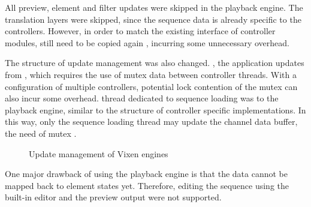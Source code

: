 All preview, element and filter updates were skipped in the playback engine. The translation layers were skipped, since the sequence data is already specific to the controllers. However, in order to match the existing interface of controller modules,  still need to be copied again , incurring some unnecessary overhead.

The structure of update management was also changed. , the application updates  from , which requires the use of mutex  data  between controller threads. With a configuration  of multiple controllers, potential lock contention of the mutex can also incur some overhead.  thread dedicated to sequence loading was  to the playback engine, similar to the structure of controller specific implementations. In this way, only the sequence loading thread may update the channel data buffer,  the need of mutex .

\begin{figure}[t]
  \centering
  \hfil
  \caption{\footnotesize Update management of Vixen engines}
  \label{fig:update}
\end{figure}

One major drawback of using the playback engine is that the  data cannot be mapped back to element states yet. Therefore, editing the  sequence using the built-in editor and the preview output were not supported.

